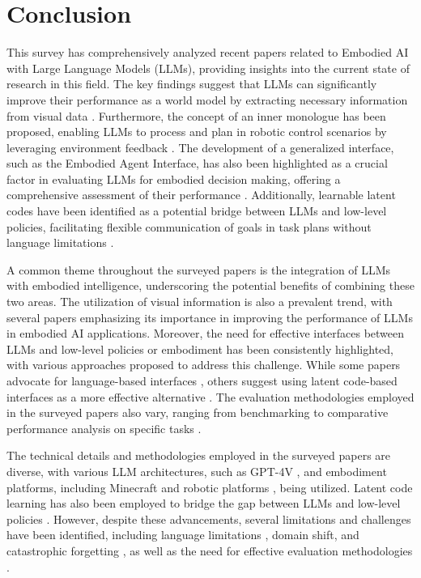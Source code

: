 \documentclass[conference]{IEEEtran}
\begin{document}
\section{Conclusion}
This survey has comprehensively analyzed recent papers related to Embodied AI with Large Language Models (LLMs), providing insights into the current state of research in this field. The key findings suggest that LLMs can significantly improve their performance as a world model by extracting necessary information from visual data \cite{b1}. Furthermore, the concept of an inner monologue has been proposed, enabling LLMs to process and plan in robotic control scenarios by leveraging environment feedback \cite{b2}. The development of a generalized interface, such as the Embodied Agent Interface, has also been highlighted as a crucial factor in evaluating LLMs for embodied decision making, offering a comprehensive assessment of their performance \cite{b3}. Additionally, learnable latent codes have been identified as a potential bridge between LLMs and low-level policies, facilitating flexible communication of goals in task plans without language limitations \cite{b4}.

A common theme throughout the surveyed papers is the integration of LLMs with embodied intelligence, underscoring the potential benefits of combining these two areas. The utilization of visual information is also a prevalent trend, with several papers emphasizing its importance in improving the performance of LLMs in embodied AI applications. Moreover, the need for effective interfaces between LLMs and low-level policies or embodiment has been consistently highlighted, with various approaches proposed to address this challenge. While some papers advocate for language-based interfaces \cite{b2}, others suggest using latent code-based interfaces as a more effective alternative \cite{b4}. The evaluation methodologies employed in the surveyed papers also vary, ranging from benchmarking \cite{b3} to comparative performance analysis on specific tasks \cite{b4}.

The technical details and methodologies employed in the surveyed papers are diverse, with various LLM architectures, such as GPT-4V \cite{b4}, and embodiment platforms, including Minecraft \cite{b1} and robotic platforms \cite{b2}, being utilized. Latent code learning has also been employed to bridge the gap between LLMs and low-level policies \cite{b4}. However, despite these advancements, several limitations and challenges have been identified, including language limitations \cite{b4}, domain shift, and catastrophic forgetting \cite{b4}, as well as the need for effective evaluation methodologies \cite{b3}.
\end{document}
